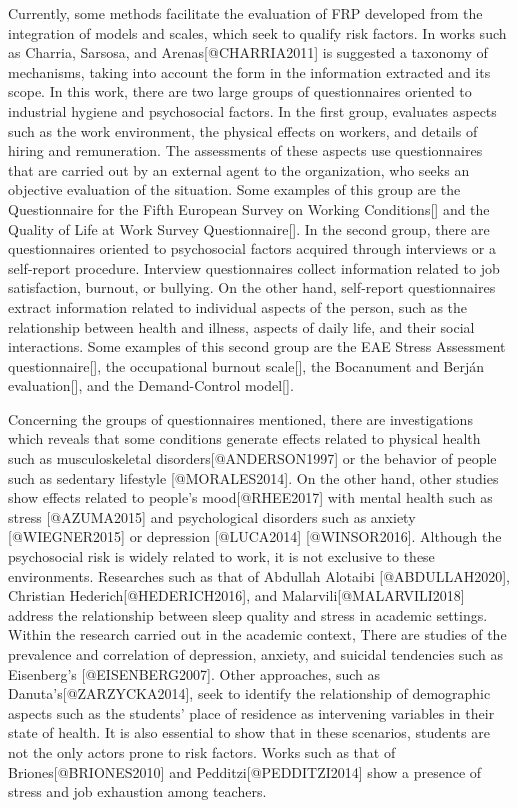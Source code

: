 \documentclass[]{article}
\begin{document}
Currently, some methods facilitate the evaluation of FRP developed from
the integration of models and scales, which seek to qualify risk
factors. In works such as Charria, Sarsosa, and Arenas{[}@CHARRIA2011{]}
is suggested a taxonomy of mechanisms, taking into account the form in
the information extracted and its scope. In this work, there are two
large groups of questionnaires oriented to industrial hygiene and
psychosocial factors. In the first group, evaluates aspects such as the
work environment, the physical effects on workers, and details of hiring
and remuneration. The assessments of these aspects use questionnaires
that are carried out by an external agent to the organization, who seeks
an objective evaluation of the situation. Some examples of this group
are the Questionnaire for the Fifth European Survey on Working
Conditions{[}{]} and the Quality of Life at Work Survey
Questionnaire{[}{]}. In the second group, there are questionnaires
oriented to psychosocial factors acquired through interviews or a
self-report procedure. Interview questionnaires collect information
related to job satisfaction, burnout, or bullying. On the other hand,
self-report questionnaires extract information related to individual
aspects of the person, such as the relationship between health and
illness, aspects of daily life, and their social interactions. Some
examples of this second group are the EAE Stress Assessment
questionnaire{[}{]}, the occupational burnout scale{[}{]}, the
Bocanument and Berján evaluation{[}{]}, and the Demand-Control
model{[}{]}.

Concerning the groups of questionnaires mentioned, there are
investigations which reveals that some conditions generate effects
related to physical health such as musculoskeletal
disorders{[}@ANDERSON1997{]} or the behavior of people such as sedentary
lifestyle {[}@MORALES2014{]}. On the other hand, other studies show
effects related to people's mood{[}@RHEE2017{]} with mental health such
as stress {[}@AZUMA2015{]} and psychological disorders such as anxiety
{[}@WIEGNER2015{]} or depression {[}@LUCA2014{]} {[}@WINSOR2016{]}.
Although the psychosocial risk is widely related to work, it is not
exclusive to these environments. Researches such as that of Abdullah
Alotaibi {[}@ABDULLAH2020{]}, Christian Hederich{[}@HEDERICH2016{]}, and
Malarvili{[}@MALARVILI2018{]} address the relationship between sleep
quality and stress in academic settings. Within the research carried out
in the academic context, There are studies of the prevalence and
correlation of depression, anxiety, and suicidal tendencies such as
Eisenberg's {[}@EISENBERG2007{]}. Other approaches, such as
Danuta's{[}@ZARZYCKA2014{]}, seek to identify the relationship of
demographic aspects such as the students' place of residence as
intervening variables in their state of health. It is also essential to
show that in these scenarios, students are not the only actors prone to
risk factors. Works such as that of Briones{[}@BRIONES2010{]} and
Pedditzi{[}@PEDDITZI2014{]} show a presence of stress and job exhaustion
among teachers.
\end{document}
